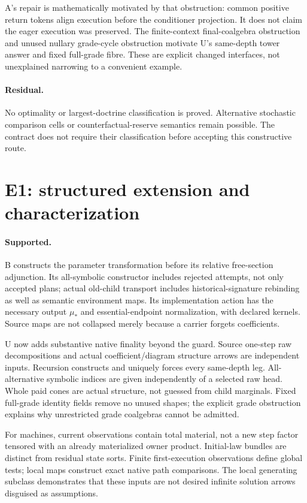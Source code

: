 \documentclass[11pt]{article}
\begin{document}
A's repair is mathematically motivated by that obstruction: common positive return tokens align execution before the conditioner projection. It does not claim the eager execution was preserved. The finite-context final-coalgebra obstruction and unused nullary grade-cycle obstruction motivate U's same-depth tower answer and fixed full-grade fibre. These are explicit changed interfaces, not unexplained narrowing to a convenient example.

\paragraph{Residual.} No optimality or largest-doctrine classification is proved. Alternative stochastic comparison cells or counterfactual-reserve semantics remain possible. The contract does not require their classification before accepting this constructive route.

\section{E1: structured extension and characterization}
\paragraph{Supported.} B constructs the parameter transformation before its relative free-section adjunction. Its all-symbolic constructor includes rejected attempts, not only accepted plans; actual old-child transport includes historical-signature rebinding as well as semantic environment maps. Its implementation action has the necessary output $\mu_*$ and essential-endpoint normalization, with declared kernels. Source maps are not collapsed merely because a carrier forgets coefficients.

U now adds substantive native finality beyond the guard. Source one-step raw decompositions and actual coefficient/diagram structure arrows are independent inputs. Recursion constructs and uniquely forces every same-depth leg. All-alternative symbolic indices are given independently of a selected raw head. Whole paid cones are actual structure, not guessed from child marginals. Fixed full-grade identity fields remove no unused shapes; the explicit grade obstruction explains why unrestricted grade coalgebras cannot be admitted.

For machines, current observations contain total material, not a new step factor tensored with an already materialized owner product. Initial-law bundles are distinct from residual state sorts. Finite first-execution observations define global tests; local maps construct exact native path comparisons. The local generating subclass demonstrates that these inputs are not desired infinite solution arrows disguised as assumptions.
\end{document}
